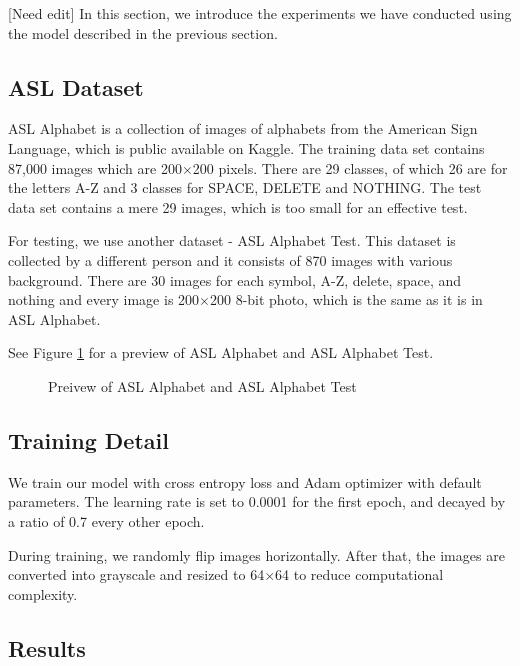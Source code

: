 \documentclass[10pt,twocolumn,letterpaper]{article}
\begin{document}
[Need edit] In this section, we introduce the experiments we have conducted using the model described in the previous section.

\subsection{ASL Dataset}

ASL Alphabet\cite{noauthor_asl_nodate} is a collection of images of alphabets from the American Sign Language, which is public available on Kaggle. The training data set contains 87,000 images which are 200$\times$200 pixels. There are 29 classes, of which 26 are for the letters A-Z and 3 classes for SPACE, DELETE and NOTHING. The test data set contains a mere 29 images, which is too small for an effective test.

For testing, we use another dataset - ASL Alphabet Test\cite{noauthor_asl_nodate-1}. This dataset is collected by a different person and it consists of 870 images with various background. There are 30 images for each symbol, A-Z, delete, space, and nothing and every image is 200$\times$200 8-bit photo, which is the same as it is in ASL Alphabet. 

See Figure \ref{fig:asl} for a preview of ASL Alphabet and ASL Alphabet Test.

\begin{figure}[h]
\begin{center}
\fbox{\rule{0pt}{2in} \rule{0.9\linewidth}{0pt}}
\end{center}
 \caption{Preivew of ASL Alphabet and ASL Alphabet Test}
\label{fig:asl}
\end{figure}


\subsection{Training Detail}\label{sec:training_detail}

We train our model with cross entropy loss and Adam optimizer\cite{kingma2014adam} with default parameters. The learning rate is set to 0.0001 for the first epoch, and decayed by a ratio of 0.7 every other epoch. 

During training, we randomly flip images horizontally. After that, the images are converted into grayscale and resized to 64$\times$64 to reduce computational complexity. 

\subsection{Results}
\end{document}
